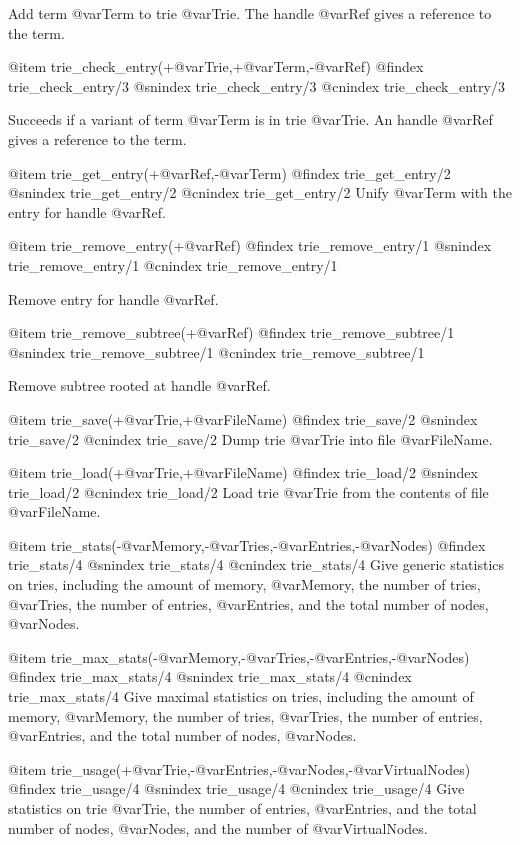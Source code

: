 Add term @var{Term} to trie @var{Trie}. The handle @var{Ref} gives
a reference to the term.

@item trie_check_entry(+@var{Trie},+@var{Term},-@var{Ref})
@findex trie_check_entry/3
@snindex trie_check_entry/3
@cnindex trie_check_entry/3

Succeeds if a variant of term @var{Term} is in trie @var{Trie}. An handle
 @var{Ref} gives a reference to the term.

@item trie_get_entry(+@var{Ref},-@var{Term})
@findex trie_get_entry/2
@snindex trie_get_entry/2
@cnindex trie_get_entry/2
Unify @var{Term} with the entry for handle @var{Ref}.

@item trie_remove_entry(+@var{Ref})
@findex trie_remove_entry/1
@snindex trie_remove_entry/1
@cnindex trie_remove_entry/1

Remove entry for handle @var{Ref}.

@item trie_remove_subtree(+@var{Ref})
@findex trie_remove_subtree/1
@snindex trie_remove_subtree/1
@cnindex trie_remove_subtree/1

Remove subtree rooted at handle @var{Ref}.

@item trie_save(+@var{Trie},+@var{FileName})
@findex trie_save/2
@snindex trie_save/2
@cnindex trie_save/2
Dump trie @var{Trie} into file @var{FileName}.


@item trie_load(+@var{Trie},+@var{FileName})
@findex trie_load/2
@snindex trie_load/2
@cnindex trie_load/2
Load trie @var{Trie} from the contents of file @var{FileName}.

@item trie_stats(-@var{Memory},-@var{Tries},-@var{Entries},-@var{Nodes})
@findex trie_stats/4
@snindex trie_stats/4
@cnindex trie_stats/4
Give generic statistics on tries, including the amount of memory,
@var{Memory}, the number of tries, @var{Tries}, the number of entries,
@var{Entries}, and the total number of nodes, @var{Nodes}.

@item trie_max_stats(-@var{Memory},-@var{Tries},-@var{Entries},-@var{Nodes})
@findex trie_max_stats/4
@snindex trie_max_stats/4
@cnindex trie_max_stats/4
Give maximal statistics on tries, including the amount of memory,
@var{Memory}, the number of tries, @var{Tries}, the number of entries,
@var{Entries}, and the total number of nodes, @var{Nodes}.


@item trie_usage(+@var{Trie},-@var{Entries},-@var{Nodes},-@var{VirtualNodes})
@findex trie_usage/4
@snindex trie_usage/4
@cnindex trie_usage/4
Give statistics on trie @var{Trie}, the number of entries,
@var{Entries}, and the total number of nodes, @var{Nodes}, and the
number of @var{VirtualNodes}.

